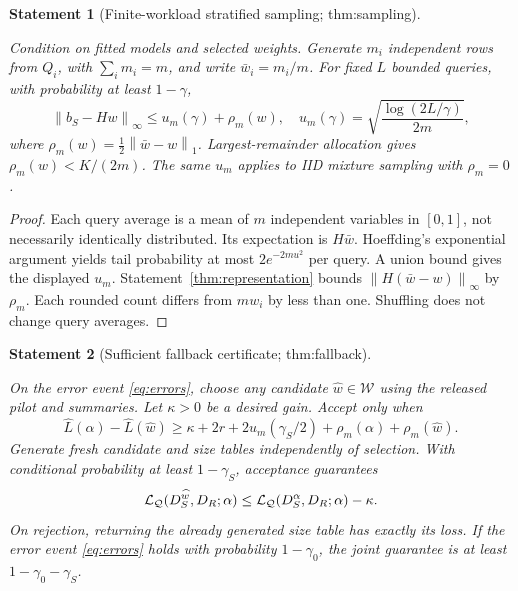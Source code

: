 \documentclass[11pt]{article}
\newtheorem{statement}{Statement}
\newcommand{\Q}{\mathcal Q}\newcommand{\Z}{\mathcal Z}\newcommand{\W}{\mathcal W}
\newcommand{\norm}[1]{\left\lVert#1\right\rVert}\newcommand{\qh}{\widehat H}
\begin{document}
\begin{statement}[Finite-workload stratified sampling; thm:sampling]\label{thm:sampling}

Condition on fitted models and selected weights. Generate $m_i$ independent rows from $Q_i$, with $\sum_i m_i=m$, and write $\bar w_i=m_i/m$. For fixed $L$ bounded queries, with probability at least $1-\gamma$,
\begin{equation}\label{eq:sampling}
\norm{b_S-Hw}_\infty
\le u_m(\gamma)+\rho_m(w),\quad
u_m(\gamma)=\sqrt{\frac{\log(2L/\gamma)}{2m}},
\end{equation}
where $\rho_m(w)=\frac12\norm{\bar w-w}_1$. Largest-remainder allocation gives $\rho_m(w)<K/(2m)$. The same $u_m$ applies to IID mixture sampling with $\rho_m=0$.

\end{statement}

\begin{proof}
Each query average is a mean of $m$ independent variables in $[0,1]$, not necessarily identically distributed. Its expectation is $H\bar w$. Hoeffding's exponential argument yields tail probability at most $2e^{-2mu^2}$ per query. A union bound gives the displayed $u_m$. Statement~\ref{thm:representation} bounds $\norm{H(\bar w-w)}_\infty$ by $\rho_m$. Each rounded count differs from $mw_i$ by less than one. Shuffling does not change query averages.
\end{proof}

\begin{statement}[Sufficient fallback certificate; thm:fallback]\label{thm:fallback}

On the error event \eqref{eq:errors}, choose any candidate $\widehat w\in\W$ using the released pilot and summaries. Let $\kappa>0$ be a desired gain. Accept only when
\begin{equation}\label{eq:certificate}
\widehat L(\alpha)-\widehat L(\widehat w)
\ge\kappa+2r+2u_m(\gamma_S/2)
+\rho_m(\alpha)+\rho_m(\widehat w).
\end{equation}
Generate fresh candidate and size tables independently of selection. With conditional probability at least $1-\gamma_S$, acceptance guarantees
\begin{equation}
\calL_\Q(D_S^{\widehat w},D_R;\alpha)
\le\calL_\Q(D_S^{\alpha},D_R;\alpha)-\kappa.
\end{equation}
On rejection, returning the already generated size table has exactly its loss. If the error event \eqref{eq:errors} holds with probability $1-\gamma_0$, the joint guarantee is at least $1-\gamma_0-\gamma_S$.

\end{statement}
\end{document}
